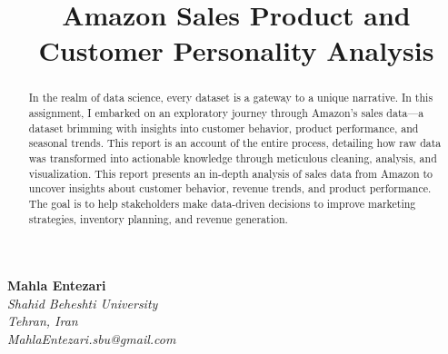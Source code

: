 \documentclass[a4paper]{article}
\title{
    \textbf{ Amazon Sales Product and Customer Personality Analysis} 
}
\date{} %
\begin{document}
\maketitle
\vspace{-1.5cm}

\begin{center}
    \textbf{Mahla Entezari}\\
    \textit{Shahid Beheshti University}\\
    \textit{Tehran, Iran}\\
    \textit{MahlaEntezari.sbu@gmail.com}
    \vfill
\end{center}


\begin{abstract}
    In the realm of data science, every dataset is a gateway to a unique narrative. In this assignment, I embarked on an exploratory journey through Amazon's sales data—a dataset brimming with insights into customer behavior, product performance, and seasonal trends. This report is an account of the entire process, detailing how raw data was transformed into actionable knowledge through meticulous cleaning, analysis, and visualization.
    This report presents an in-depth analysis of sales data from Amazon to uncover insights about customer behavior, revenue trends, and product performance. The goal is to help stakeholders make data-driven decisions to improve marketing strategies, inventory planning, and revenue generation.
\end{abstract}


\singlespacing
\setlength{\parskip}{6pt}
\setlength{\parindent}{0.5cm}
\end{document}
